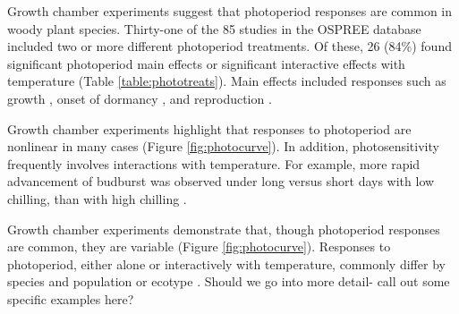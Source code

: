 \documentclass{article}
\begin{document}
\par Growth chamber experiments suggest that photoperiod responses are common in woody plant species. Thirty-one of the 85 studies in the OSPREE database included two or more different photoperiod treatments. Of these, 26 (84\%) found significant photoperiod main effects or significant interactive effects with temperature (Table \ref{table:phototreats}). Main effects included responses such as growth \citep[e.g., higher growth rates with longer days ][]{Ashby:1962aa}, onset of dormancy \citep[e.g., more rapid induction of budset with shorter days][]{Howe:1995aa}, and reproduction \citep[e.g., increased flowering with longer days ][]{Heide:2012aa}. 
\par Growth chamber experiments highlight that responses to photoperiod are nonlinear in many cases  (Figure \ref {fig:photocurve}). In addition, photosensitivity frequently involves interactions with temperature. For example, more rapid advancement of budburst was observed under long versus short days with low chilling, than with high chilling \citep{Hawkins:2012}. 
\par Growth chamber experiments demonstrate that, though photoperiod responses are common, they are variable (Figure \ref{fig:photocurve}). Responses to photoperiod, either alone or interactively with temperature, commonly differ by species and population or ecotype \citep[e.g.,][]{Howe:1996,Basler:2012, Basler:2014aa,zohner2016,flynn2018}. Should we go into more detail- call out some specific examples here?
\end{document}
